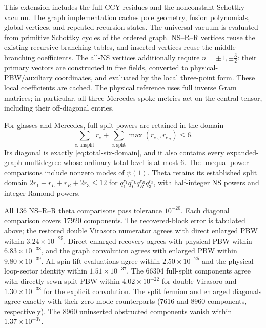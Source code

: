 \documentclass[11pt]{article}
\numberwithin{equation}{section}
\begin{document}
This extension includes the full CCY residues and the nonconstant
Schottky vacuum. The graph implementation caches pole geometry, fusion
polynomials, global vertices, and repeated recursion states. The universal
vacuum is evaluated from primitive Schottky cycles of the ordered graph.
NS--R--R vertices reuse the existing recursive branching tables, and
inserted vertices reuse the middle branching coefficients. The all-NS
vertices additionally require $n=\pm1,\pm\frac32$: their primary vectors
are constructed in free fields, converted to physical-PBW/auxiliary
coordinates, and evaluated by the local three-point form. These local
coefficients are cached. The physical reference uses full inverse Gram
matrices; in particular, all three Mercedes spoke metrics act on the
central tensor, including their off-diagonal entries.

For glasses and Mercedes, full split powers are retained in the domain
\begin{equation}
 \sum_{e:\text{unsplit}}r_e+
 \sum_{e:\text{split}}\max(r_{e_L},r_{e_R})\le6.
 \label{eq:total-six-split-domain}
\end{equation}
Its diagonal is exactly \eqref{eq:total-six-domain}, and it also contains
every expanded-graph multidegree whose ordinary total level is at most 6.
The unequal-power comparisons include nonzero modes of $\psi(1)$.
Theta retains its established split domain
$2r_1+r_L+r_R+2r_3\le12$ for
$q_1^{r_1}q_L^{r_L}q_R^{r_R}q_3^{r_3}$, with half-integer NS powers
and integer Ramond powers.

All 136 NS--R--R theta comparisons pass tolerance $10^{-20}$. Each
diagonal comparison covers 17920 components. The recovered-block error
is tabulated above; the restored double Virasoro numerator agrees with
direct enlarged PBW within $3.24\times10^{-25}$. Direct enlarged recovery
agrees with physical PBW within $6.83\times10^{-38}$, and the graph
convolution agrees with enlarged PBW within $9.80\times10^{-39}$.
All spin-lift evaluations agree within $2.50\times10^{-25}$ and the
physical loop-sector identity within $1.51\times10^{-37}$.
The 66304 full-split components agree with directly sewn split PBW within
$4.02\times10^{-22}$ for double Virasoro and $1.30\times10^{-38}$ for
the explicit convolution. The split fermion and enlarged diagonals agree
exactly with their zero-mode counterparts (7616 and 8960 components,
respectively). The 8960 uninserted obstructed components vanish within
$1.37\times10^{-37}$.
\end{document}
